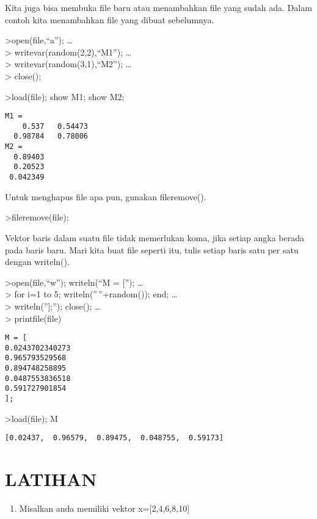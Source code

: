 \documentclass[
]{book}
\providecommand{\tightlist}{%
  \setlength{\itemsep}{0pt}\setlength{\parskip}{0pt}}
\begin{document}
Kita juga bisa membuka file baru atau menambahkan file yang sudah ada. Dalam contoh kita menambahkan file yang dibuat sebelumnya.

\textgreater open(file,``a''); \ldots{}\\
\textgreater{} writevar(random(2,2),``M1''); \ldots{}\\
\textgreater{} writevar(random(3,1),``M2''); \ldots{}\\
\textgreater{} close();

\textgreater load(file); show M1; show M2;

\begin{verbatim}
M1 = 
    0.537   0.54473 
  0.98784   0.78006 
M2 = 
  0.89403 
  0.20523 
 0.042349 
\end{verbatim}

Untuk menghapus file apa pun, gunakan fileremove().

\textgreater fileremove(file);

Vektor baris dalam suatu file tidak memerlukan koma, jika setiap angka berada pada baris baru. Mari kita buat file seperti itu, tulis setiap baris satu per satu dengan writeln().

\textgreater open(file,``w''); writeln(``M = {[}''); \ldots{}\\
\textgreater{} for i=1 to 5; writeln(''\,''+random()); end; \ldots{}\\
\textgreater{} writeln(''{]};''); close(); \ldots{}\\
\textgreater{} printfile(file)

\begin{verbatim}
M = [
0.0243702340273
0.965793529568
0.894748258895
0.0487553836518
0.591727901854
];
\end{verbatim}

\textgreater load(file); M

\begin{verbatim}
[0.02437,  0.96579,  0.89475,  0.048755,  0.59173]
\end{verbatim}

\section{LATIHAN}\label{latihan}

\begin{enumerate}
\def\labelenumi{\arabic{enumi}.}
\tightlist
\item
  Misalkan anda memiliki vektor x={[}2,4,6,8,10{]}
\end{enumerate}
\end{document}
